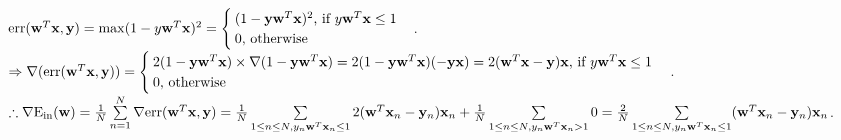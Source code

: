 \newcommand{\w}{\mathbf{w}}
\newcommand{\x}{\mathbf{x}}
\newcommand{\y}{\mathbf{y}}
\newcommand{\err}{\mathrm{err}}
\newcommand{\Ein}{\mathrm{E_{in}}}

\begin{pr}
$\err(\w^T\x, \y)=\max(1-y\w^T\x)^2\\
=\begin{cases}
(1-\y\w^T\x)^2\text{, if }y\w^T\x\leq1\\
0\text{, otherwise}
\end{cases}$.\\
$\then\nabla(\err(\w^T\x, \y))=\begin{cases}
2(1-\y\w^T\x)\times\nabla(1-\y\w^T\x)=2(1-\y\w^T\x)(-\y\x)=2(\w^T\x-\y)\x\text{, if }y\w^T\x\leq1\\
0\text{, otherwise}
\end{cases}$.\\
$\so\nabla\Ein(\w)=\frac1N\suml_{n=1}^N\nabla\err(\w^T\x, \y)=\frac1N\suml_{1\leq n\leq N, y_n\w^T\x_n\leq1}2(\w^T\x_n-\y_n)\x_n+\frac1N\suml_{1\leq n\leq N, y_n\w^T\x_n>1}0\\
=\frac2N\suml_{1\leq n\leq N, y_n\w^T\x_n\leq1}(\w^T\x_n-\y_n)\x_n$.
\end{pr}
